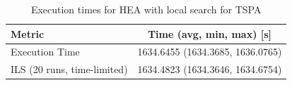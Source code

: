 \begin{table}[h!]
\centering
\begin{tabular}{lc}
\hline
Metric & Time (avg, min, max) [s] \\
\hline
Execution Time & 1634.6455 (1634.3685, 1636.0765) \\
ILS (20 runs, time-limited) & 1634.4823 (1634.3646, 1634.6754) \\
\hline
\end{tabular}
\caption{Execution times for HEA with local search for TSPA}
\label{tab:TSPA_hea_with_ls_timings}
\end{table}
